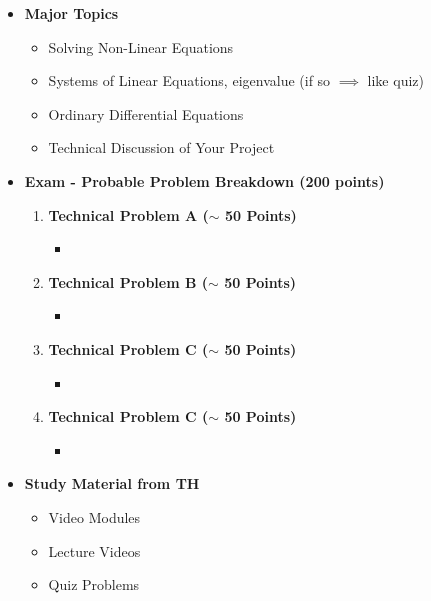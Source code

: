 \documentclass[11pt]{article}
\begin{document}
\begin{itemize}
\newpage

\item\textbf{\Large Major Topics}\\
	\begin{itemize}


		\item  {\large Solving Non-Linear Equations}
		\item  {\large Systems of Linear Equations, eigenvalue (if so $\implies$ like quiz)}
		\item  {\large Ordinary Differential Equations}
		\item  {\large Technical Discussion of Your Project }

	\end{itemize}


%
\item  \textbf{\Large Exam  - Probable Problem Breakdown (200 points) }\\
\Large
	\begin{enumerate}


		\item  \textbf{\Large Technical Problem A ($\sim$ 50 Points)}\\
		\begin{itemize}
			\item 
		\end{itemize}
		\item  \textbf{\Large Technical Problem B ($\sim$ 50 Points)}\\
		\begin{itemize}
			\item 
		\end{itemize}
		\item  \textbf{\Large Technical Problem C ($\sim$ 50 Points)}\\
		\begin{itemize}
			\item 
	\end{itemize}	
		\item  \textbf{\Large Technical Problem C ($\sim$ 50 Points)}\\
		\begin{itemize}
			\item 

		\end{itemize}

	\end{enumerate}

\item  \textbf{\Large Study Material from TH}\\
\begin{itemize}

\item Video Modules 

\item Lecture Videos

\item Quiz Problems 

\end{itemize}

\end{itemize}


	
\end{document}
